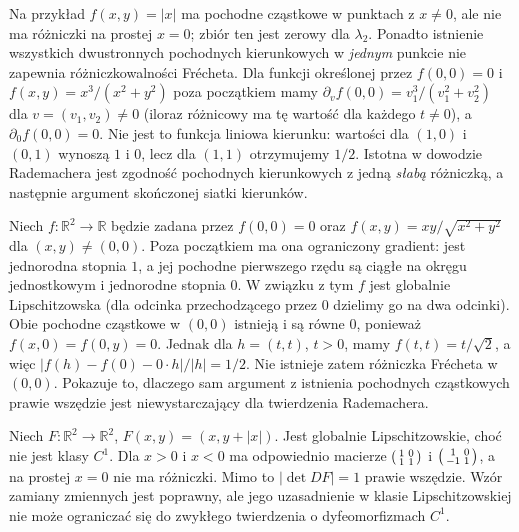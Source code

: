 \begin{uwaga}
Na przykład $f(x,y)=|x|$ ma pochodne cząstkowe
w punktach z $x\ne0$, ale nie ma różniczki na prostej
$x=0$; zbiór ten jest zerowy dla $\lambda_2$.
Ponadto istnienie wszystkich dwustronnych pochodnych
kierunkowych w \emph{jednym} punkcie nie zapewnia
różniczkowalności Frécheta. Dla funkcji określonej przez
$f(0,0)=0$ i $f(x,y)=x^3/(x^2+y^2)$ poza początkiem
mamy $\partial_v f(0,0)=v_1^3/(v_1^2+v_2^2)$ dla
$v=(v_1,v_2)\ne0$ (iloraz różnicowy ma tę wartość
dla każdego $t\ne0$), a $\partial_0 f(0,0)=0$.
Nie jest to funkcja liniowa kierunku: wartości dla
$(1,0)$ i $(0,1)$ wynoszą $1$ i $0$, lecz dla $(1,1)$
otrzymujemy $1/2$. Istotna w dowodzie
Rademachera jest zgodność pochodnych kierunkowych
z jedną \emph{słabą} różniczką, a następnie
argument skończonej siatki kierunków.
\end{uwaga}

\begin{przyklad}
Niech $f:\mathbb R^2\to\mathbb R$ będzie zadana przez
$f(0,0)=0$ oraz $f(x,y)=xy/\sqrt{x^2+y^2}$
dla $(x,y)\ne(0,0)$. Poza początkiem ma ona
ograniczony gradient: jest jednorodna stopnia $1$,
a jej pochodne pierwszego rzędu są ciągłe na
okręgu jednostkowym i jednorodne stopnia $0$.
W związku z tym $f$ jest globalnie Lipschitzowska
(dla odcinka przechodzącego przez $0$ dzielimy go
na dwa odcinki). Obie pochodne cząstkowe w $(0,0)$
istnieją i są równe $0$, ponieważ $f(x,0)=f(0,y)=0$.
Jednak dla $h=(t,t)$, $t>0$, mamy
$f(t,t)=t/\sqrt2$, a więc
$|f(h)-f(0)-0\cdot h|/|h|=1/2$.
Nie istnieje zatem różniczka Frécheta w $(0,0)$.
Pokazuje to, dlaczego sam argument z istnienia
pochodnych cząstkowych prawie wszędzie jest
niewystarczający dla twierdzenia Rademachera.
\end{przyklad}

\begin{przyklad}
Niech $F:\mathbb R^2\to\mathbb R^2$,
$F(x,y)=(x,y+|x|)$. Jest globalnie Lipschitzowskie,
choć nie jest klasy $C^1$. Dla $x>0$ i $x<0$
ma odpowiednio macierze $\begin{psmallmatrix}1&0\\1&1\end{psmallmatrix}$
i $\begin{psmallmatrix}1&0\\-1&1\end{psmallmatrix}$,
a na prostej $x=0$ nie ma różniczki. Mimo to
$|\det DF|=1$ prawie wszędzie. Wzór zamiany
zmiennych jest poprawny, ale jego uzasadnienie
w klasie Lipschitzowskiej nie może ograniczać się
do zwykłego twierdzenia o dyfeomorfizmach $C^1$.
\end{przyklad}

